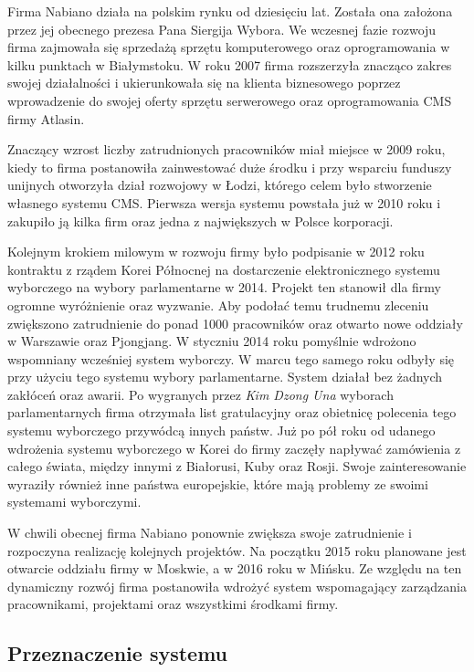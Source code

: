 Firma Nabiano działa na polskim rynku od dziesięciu lat. Została ona
założona przez jej obecnego prezesa Pana Siergija Wybora. We wczesnej
fazie rozwoju firma zajmowała się sprzedażą sprzętu komputerowego
oraz oprogramowania w kilku punktach w Białymstoku. W roku 2007 firma
rozszerzyła znacząco zakres swojej działalności i ukierunkowała się na
klienta biznesowego poprzez wprowadzenie do swojej oferty sprzętu
serwerowego oraz oprogramowania CMS firmy Atlasin.

Znaczący wzrost liczby zatrudnionych pracowników miał miejsce w 2009
roku, kiedy to firma postanowiła zainwestować duże środku i przy
wsparciu funduszy unijnych otworzyła dział rozwojowy w Łodzi, którego celem
było stworzenie własnego systemu CMS. Pierwsza wersja systemu powstała
już w 2010 roku i zakupiło ją kilka firm oraz jedna z największych w
Polsce korporacji.

Kolejnym krokiem milowym w rozwoju firmy było podpisanie w 2012 roku
kontraktu z rządem Korei Północnej na dostarczenie elektronicznego
systemu wyborczego na wybory parlamentarne w 2014. Projekt ten
stanowił dla firmy ogromne wyróżnienie oraz wyzwanie. Aby podołać temu
trudnemu zleceniu zwiększono zatrudnienie do ponad 1000 pracowników
oraz otwarto nowe oddziały w Warszawie oraz Pjongjang. W styczniu 2014
roku pomyślnie wdrożono wspomniany wcześniej system wyborczy. W marcu
tego samego roku odbyły się przy użyciu tego systemu wybory
parlamentarne. System działał bez żadnych zakłóceń oraz awarii. Po
wygranych przez {\it Kim Dzong Una} wyborach parlamentarnych firma
otrzymała list gratulacyjny oraz obietnicę polecenia tego systemu
wyborczego przywódcą innych państw. Już po pół roku od udanego
wdrożenia systemu wyborczego w Korei do firmy zaczęły napływać
zamówienia z całego świata, między innymi z Białorusi, Kuby oraz
Rosji. Swoje zainteresowanie wyraziły również inne państwa
europejskie, które mają problemy ze swoimi systemami wyborczymi.

W chwili obecnej firma Nabiano ponownie zwiększa swoje zatrudnienie i
rozpoczyna realizację kolejnych projektów. Na początku 2015 roku
planowane jest otwarcie oddziału firmy w Moskwie, a w 2016 roku w
Mińsku. Ze względu na ten dynamiczny rozwój firma postanowiła wdrożyć
system wspomagający zarządzania pracownikami, projektami oraz
wszystkimi środkami firmy.

\subsection{Przeznaczenie systemu}

